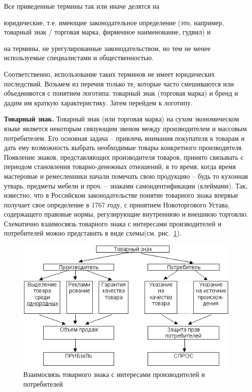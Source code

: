 Все приведенные термины так или иначе делятся на
\begin{enumerate*}[label=\asbuk*)]
\item юридические, т.е. имеющие законодательное определение
  (это, например, товарный знак / торговая марка, фирменное наименование, гудвил) и
\item на термины, не урегулированные законодательством, но тем не менее
  используемые специалистами и общественностью.
\end{enumerate*}
Соответственно, использование таких терминов не имеет юридических последствий.
Возьмем из перечня только те, которые часто смешиваются  или объединяются с
понятием логотипа: товарный знак (торговая марка) и бренд и дадим им краткую
характеристику. Затем перейдем к логотипу.

 \textbf{Товарный знак.} Товарный знак (или торговая марка) на сухом
  экономическом языке является некоторым связующим звеном между производителем
  и массовым потребителем. Его основная задача -- привлечь внимания покупателя к
  товарам и дать ему возможность выбрать необходимые товары конкретного
  производителя. Появление знаков, представляющих производителя товаров,
  принято связывать с периодом становления товарно-денежных отношений, в то
  время, когда время мастеровые и ремесленники начали помечать свою продукцию --
  будь то кухонная утварь, предметы мебели и проч. -- знаками
  самоидентификации (клеймами). Так, известно, что в Российском законодательстве
  понятие товарного знака впервые получает свое определение  в 1767 году,
  с принятием Новоторгового Устава, содержащего правовые нормы,
  регулирующие внутреннюю и внешнюю торговлю\autocite{pantuhinaAM}.
  Схематично взаимосвязь товарного знака с интересами производителей и
  потребителей можно представить в виде схемы(см. рис.~\ref{fig:pantuhina}).
  \begin{figure}[h!]
  \centering
  \includegraphics[width=.7\linewidth]{images/pantuhina}
  \caption{Взаимосвязь товарного знака с интересами производителей и потребителей}
  \label{fig:pantuhina}
\end{figure}

